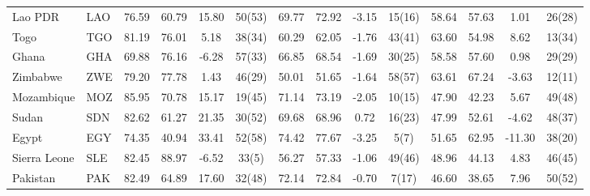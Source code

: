 \begin{longtable}{m{2.4cm}lcccc|cccc|cccc}
Lao PDR                           & LAO           & 76.59            & 60.79              & 15.80            & 50(53)           & 69.77    & 72.92      & -3.15    & 15(16)   & 58.64           & 57.63             & 1.01            & 26(28)          \\
Togo                              & TGO           & 81.19            & 76.01              & 5.18             & 38(34)           & 60.29    & 62.05      & -1.76    & 43(41)   & 63.60           & 54.98             & 8.62            & 13(34)          \\
Ghana                             & GHA           & 69.88            & 76.16              & -6.28            & 57(33)           & 66.85    & 68.54      & -1.69    & 30(25)   & 58.58           & 57.60             & 0.98            & 29(29)          \\
Zimbabwe                          & ZWE           & 79.20            & 77.78              & 1.43             & 46(29)           & 50.01    & 51.65      & -1.64    & 58(57)   & 63.61           & 67.24             & -3.63           & 12(11)          \\
Mozambique                        & MOZ           & 85.95            & 70.78              & 15.17            & 19(45)           & 71.14    & 73.19      & -2.05    & 10(15)   & 47.90           & 42.23             & 5.67            & 49(48)          \\
Sudan                             & SDN           & 82.62            & 61.27              & 21.35            & 30(52)           & 69.68    & 68.96      & 0.72     & 16(23)   & 47.99           & 52.61             & -4.62           & 48(37)          \\
Egypt                             & EGY           & 74.35            & 40.94              & 33.41            & 52(58)           & 74.42    & 77.67      & -3.25    & 5(7)     & 51.65           & 62.95             & -11.30          & 38(20)          \\
Sierra Leone                      & SLE           & 82.45            & 88.97              & -6.52            & 33(5)            & 56.27    & 57.33      & -1.06    & 49(46)   & 48.96           & 44.13             & 4.83            & 46(45)          \\
Pakistan                          & PAK           & 82.49            & 64.89              & 17.60            & 32(48)           & 72.14    & 72.84      & -0.70    & 7(17)    & 46.60           & 38.65             & 7.96            & 50(52)          \\

\end{longtable}
